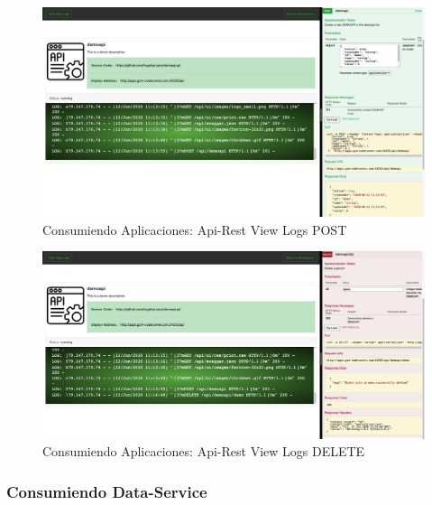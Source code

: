 \documentclass[a4paper,11pt]{book}
\begin{document}
~\\
~\\
~\\
~\\
\begin{figure}[H]
\centering
\includegraphics[scale=0.25]{imagenes/casouso_a/1_9.png}
\caption{ Consumiendo Aplicaciones: Api-Rest View Logs POST}
\label{1_9}
\end{figure}

\begin{figure}[H]
\centering
\includegraphics[scale=0.25]{imagenes/casouso_a/1_10.png}
\caption{ Consumiendo Aplicaciones: Api-Rest View Logs DELETE }
\label{1_10}
\end{figure}

\subsubsection{Consumiendo Data-Service}
\end{document}
